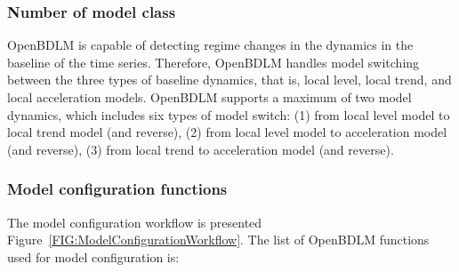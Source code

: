 \subsubsection{Number of model class}

OpenBDLM is capable of detecting regime changes in the dynamics in the baseline of the time series. Therefore, OpenBDLM handles model switching between the three types of baseline dynamics, that is, local level, local trend, and local acceleration models. OpenBDLM supports a maximum of two model dynamics, which includes six types of model switch: (1) from local level model to local trend model (and reverse), (2) from local level model to acceleration model (and reverse), (3) from local trend to acceleration model (and reverse).


\subsubsection{Model configuration functions}

The model configuration workflow is presented Figure~\ref{FIG:ModelConfigurationWorkflow}. The list of OpenBDLM functions used for model configuration is:

